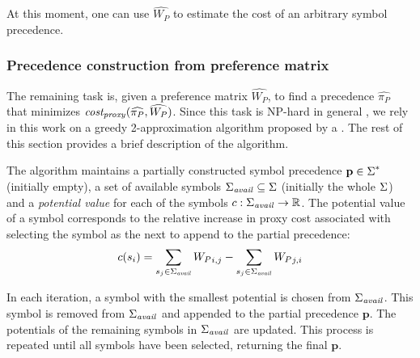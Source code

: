 At this moment, one can use \(\widehat{W_P}\) to estimate the cost of an arbitrary symbol precedence.

\subsubsection{Precedence construction from preference matrix} \label{sect:ltot}

The remaining task is, given a preference matrix \(\widehat{W_P}\), to find a precedence \(\widehat{\pi_P}\)
that minimizes \(\operatorname{\mathit{cost_{proxy}}}(\widehat{\pi_P}, \widehat{W_P})\).
Since this task is NP-hard in general \cite{Cohen2011},
we rely in this work on a greedy 2-approximation algorithm
proposed by a \citet{Cohen2011}.
The rest of this section provides a brief description of the algorithm.

\newcommand{\SymbolsAvail}{\symbols_{\mathit{avail}}}
\newcommand{\potential}{c}

The algorithm maintains a partially constructed symbol precedence \(\mathbf{p} \in \operatorname{\Sigma}^*\) (initially empty),
a set of available symbols \(\SymbolsAvail \subseteq \symbols\) (initially the whole \(\operatorname{\Sigma}\))
and a \emph{potential value} for each of the symbols \(\potential: \SymbolsAvail \to \re\).
The potential value of a symbol corresponds to the relative increase in proxy cost
associated with selecting the symbol as the next to append to the partial precedence:
\begin{align*}
\potential(s_i) = \sum_{s_j \in \SymbolsAvail} {W_P}_{i, j} - \sum_{s_j \in \SymbolsAvail} {W_P}_{j, i}
\end{align*}

In each iteration, a symbol with the smallest potential is chosen from \(\SymbolsAvail\).
This symbol is removed from \(\SymbolsAvail\) and appended to the partial precedence \(\mathbf{p}\).
The potentials of the remaining symbols in \(\SymbolsAvail\) are updated.
This process is repeated until all symbols have been selected,
returning the final \(\mathbf{p}\).


